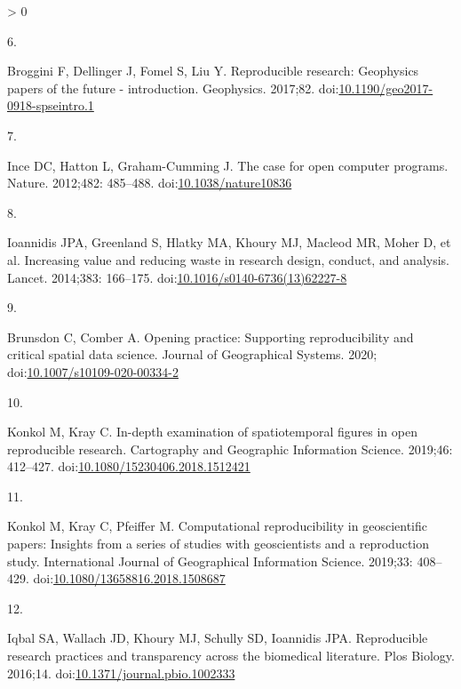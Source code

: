 \documentclass[10pt,letterpaper]{article}
\newlength{\csllabelwidth}
\newlength{\cslhangindent}
\newenvironment{CSLReferences}[3] %
 {%
  \setlength{\parindent}{0pt}
  \ifodd #1 \everypar{\setlength{\hangindent}{\cslhangindent}}\ignorespaces\fi
  \ifnum #2 > 0
  \setlength{\parskip}{#2\baselineskip}
  \fi
 }%
 {}
\newcommand{\CSLLeftMargin}[1]{\parbox[t]{\csllabelwidth}{#1}}
\newcommand{\CSLRightInline}[1]{\parbox[t]{\linewidth - \csllabelwidth}{#1}}
\begin{document}
\begin{CSLReferences}{0}{0}
\leavevmode\hypertarget{ref-Broggini2017reproducible}{}%
\CSLLeftMargin{6. }
\CSLRightInline{Broggini F, Dellinger J, Fomel S, Liu Y. Reproducible
research: Geophysics papers of the future - introduction. Geophysics.
2017;82.
doi:\href{https://doi.org/10.1190/geo2017-0918-spseintro.1}{10.1190/geo2017-0918-spseintro.1}}

\leavevmode\hypertarget{ref-Ince2012case}{}%
\CSLLeftMargin{7. }
\CSLRightInline{Ince DC, Hatton L, Graham-Cumming J. The case for open
computer programs. Nature. 2012;482: 485--488.
doi:\href{https://doi.org/10.1038/nature10836}{10.1038/nature10836}}

\leavevmode\hypertarget{ref-Ioannidis2014increasing}{}%
\CSLLeftMargin{8. }
\CSLRightInline{Ioannidis JPA, Greenland S, Hlatky MA, Khoury MJ,
Macleod MR, Moher D, et al. Increasing value and reducing waste in
research design, conduct, and analysis. Lancet. 2014;383: 166--175.
doi:\href{https://doi.org/10.1016/s0140-6736(13)62227-8}{10.1016/s0140-6736(13)62227-8}}

\leavevmode\hypertarget{ref-Brunsdon2020opening}{}%
\CSLLeftMargin{9. }
\CSLRightInline{Brunsdon C, Comber A. Opening practice: Supporting
reproducibility and critical spatial data science. Journal of
Geographical Systems. 2020;
doi:\href{https://doi.org/10.1007/s10109-020-00334-2}{10.1007/s10109-020-00334-2}}

\leavevmode\hypertarget{ref-Konkol2019examination}{}%
\CSLLeftMargin{10. }
\CSLRightInline{Konkol M, Kray C. In-depth examination of spatiotemporal
figures in open reproducible research. Cartography and Geographic
Information Science. 2019;46: 412--427.
doi:\href{https://doi.org/10.1080/15230406.2018.1512421}{10.1080/15230406.2018.1512421}}

\leavevmode\hypertarget{ref-Konkol2019computational}{}%
\CSLLeftMargin{11. }
\CSLRightInline{Konkol M, Kray C, Pfeiffer M. Computational
reproducibility in geoscientific papers: Insights from a series of
studies with geoscientists and a reproduction study. International
Journal of Geographical Information Science. 2019;33: 408--429.
doi:\href{https://doi.org/10.1080/13658816.2018.1508687}{10.1080/13658816.2018.1508687}}

\leavevmode\hypertarget{ref-Iqbal2016reproducible}{}%
\CSLLeftMargin{12. }
\CSLRightInline{Iqbal SA, Wallach JD, Khoury MJ, Schully SD, Ioannidis
JPA. Reproducible research practices and transparency across the
biomedical literature. Plos Biology. 2016;14.
doi:\href{https://doi.org/10.1371/journal.pbio.1002333}{10.1371/journal.pbio.1002333}}


\end{CSLReferences}
\end{document}
